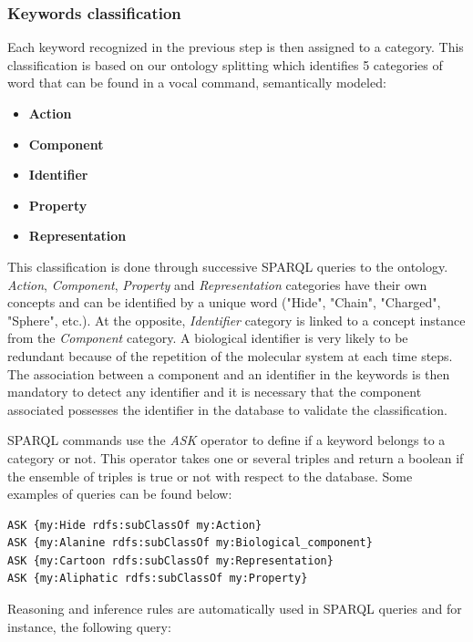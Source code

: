 \documentclass{vgtc}                          %
\begin{document}
\subsubsection{Keywords classification}

Each keyword recognized in the previous step is then assigned to a category. This classification is based on our ontology splitting which identifies 5 categories of word that can be found in a vocal command, semantically modeled:

\begin{itemize}
  \item \textbf{Action}
  \item \textbf{Component}
  \item \textbf{Identifier}
  \item \textbf{Property}
  \item \textbf{Representation}
\end{itemize}

This classification is done through successive SPARQL queries to the ontology. \textit{Action}, \textit{Component}, \textit{Property} and \textit{Representation} categories have their own concepts and can be identified by a unique word ("Hide", "Chain", "Charged", "Sphere", etc.). At the opposite, \textit{Identifier} category is linked to a concept instance from the \textit{Component} category. A biological identifier is very likely to be redundant because of the repetition of the molecular system at each time steps. The association between a component and an identifier in the keywords is then mandatory to detect any identifier and it is necessary that the component associated possesses the identifier in the database to validate the classification. 

SPARQL commands use the \textit{ASK} operator to define if a keyword belongs to a category or not. This operator takes one or several triples and return a boolean if the ensemble of triples is true or not with respect to the database. Some examples of queries can be found below:

\begin{lstlisting}[language=XML]
ASK {my:Hide rdfs:subClassOf my:Action}
ASK {my:Alanine rdfs:subClassOf my:Biological_component}
ASK {my:Cartoon rdfs:subClassOf my:Representation}
ASK {my:Aliphatic rdfs:subClassOf my:Property}
\end{lstlisting}

Reasoning and inference rules are automatically used in SPARQL queries and for instance, the following query:
\end{document}
